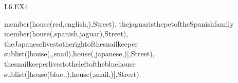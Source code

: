 \begin{mozartANSWER}{L6.EX4}
\begin{mozartCODEDISPLAY}
{\mozartSPACE{}\mozartSPACE{}\mozartSPACE{}\mozartSPACE{}\mozartSPACE{}\mozartSPACE{}\mozartSPACE{}member(house(red,english,\mozartUNDERSCORE{}),\mozartSPACE{}Street),\mozartNEWLINE
\mozartSPACE{}\mozartSPACE{}\mozartSPACE{}\mozartSPACE{}\mozartSPACE{}\mozartSPACE{}\mozartSPACE{}\mozartPERCENT{}\mozartPERCENT{}\mozartSPACE{}the\mozartSPACE{}jaguar\mozartSPACE{}is\mozartSPACE{}the\mozartSPACE{}pet\mozartSPACE{}of\mozartSPACE{}the\mozartSPACE{}Spanish\mozartSPACE{}family\mozartNEWLINE
\mozartSPACE{}\mozartSPACE{}\mozartSPACE{}\mozartSPACE{}\mozartSPACE{}\mozartSPACE{}\mozartSPACE{}member(house(\mozartUNDERSCORE{},spanish,jaguar),\mozartSPACE{}Street),\mozartSPACE{}\mozartSPACE{}\mozartSPACE{}\mozartSPACE{}\mozartSPACE{}\mozartSPACE{}\mozartSPACE{}\mozartNEWLINE
\mozartSPACE{}\mozartSPACE{}\mozartSPACE{}\mozartSPACE{}\mozartSPACE{}\mozartSPACE{}\mozartSPACE{}\mozartPERCENT{}\mozartPERCENT{}\mozartSPACE{}the\mozartSPACE{}Japanese\mozartSPACE{}lives\mozartSPACE{}to\mozartSPACE{}the\mozartSPACE{}right\mozartSPACE{}of\mozartSPACE{}the\mozartSPACE{}snail\mozartSPACE{}keeper\mozartNEWLINE
\mozartSPACE{}\mozartSPACE{}\mozartSPACE{}\mozartSPACE{}\mozartSPACE{}\mozartSPACE{}\mozartSPACE{}sublist([house(\mozartUNDERSCORE{},\mozartUNDERSCORE{},snail),house(\mozartUNDERSCORE{},japanese,\mozartUNDERSCORE{})],\mozartSPACE{}Street),\mozartNEWLINE
\mozartSPACE{}\mozartSPACE{}\mozartSPACE{}\mozartSPACE{}\mozartSPACE{}\mozartSPACE{}\mozartSPACE{}\mozartPERCENT{}\mozartPERCENT{}\mozartSPACE{}the\mozartSPACE{}snail\mozartSPACE{}keeper\mozartSPACE{}lives\mozartSPACE{}to\mozartSPACE{}the\mozartSPACE{}left\mozartSPACE{}of\mozartSPACE{}the\mozartSPACE{}blue\mozartSPACE{}house\mozartNEWLINE
\mozartSPACE{}\mozartSPACE{}\mozartSPACE{}\mozartSPACE{}\mozartSPACE{}\mozartSPACE{}\mozartSPACE{}sublist([house(blue,\mozartUNDERSCORE{},\mozartUNDERSCORE{}),house(\mozartUNDERSCORE{},snail,\mozartUNDERSCORE{})],\mozartSPACE{}Street).}\end{mozartCODEDISPLAY}
\end{mozartANSWER}
